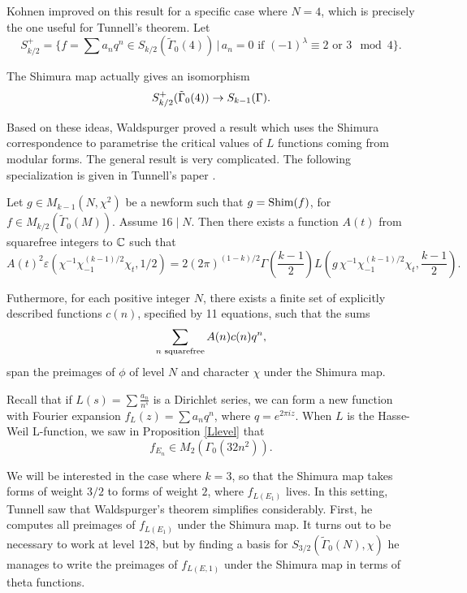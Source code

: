\documentclass[12pt, a4paper]{report}
\begin{document}
Kohnen improved on this result for a specific case where $N = 4$, which is
precisely the one useful for Tunnell's theorem. Let
\[S_{k/2}^+ = \{f = \sum a_n q^n \in S_{k/2}(\tilde{\Gamma}_0(4)) \, | \,
  a_n = 0 \text{ if } (-1)^\lambda \equiv 2 \text{ or } 3 \mod{4}\}.\]

\begin{thm}
  The Shimura map actually gives an isomorphism
  \[S_{k/2}^+(\tilde{\Gamma}_0(4)) \rightarrow S_{k-1}(\Gamma).\]
\end{thm}

Based on these ideas, Waldspurger proved a result which uses the Shimura
correspondence to parametrise the critical values of $L$ functions coming from
modular forms. The general result is very complicated. The following
specialization is given in Tunnell's paper \cite[Page 328]{Tunnell}.

\begin{thm}
  Let $g \in M_{k-1}(N, \chi^2)$ be a newform such that $g = \textnormal{Shim}(f)$, for
  $f \in M_{k/2}(\tilde{\Gamma}_0(M))$. Assume $16 \mid N$. Then there exists a
  function $A(t)$ from squarefree integers to ${\mathbb C}$ such that
  $$A(t)^2 \varepsilon(\chi^{-1} \chi_{-1}^{(k-1)/2} \chi_t, 1/2)
  =2(2\pi)^{(1-k)/2} \Gamma\left(\frac{k-1}{2}\right)
  L\left(g \, \chi^{-1} \chi_{-1}^{(k-1)/2}
      \chi_t, \frac{k-1}{2}\right).$$

  Futhermore, for each positive integer $N$, there exists a finite set of explicitly
  described functions $c(n)$, specified by 11 equations, such that the sums
  \[\sum\limits_{n \textnormal{ squarefree}} A(n)c(n)q^n,\]
  span the preimages of $\phi$ of level $N$ and character $\chi$ under the
  Shimura map.
\end{thm}

Recall that if $L(s) = \sum \frac{a_n}{n^s}$ is a Dirichlet series, we can form
a new function with Fourier expansion $f_L(z) = \sum a_n q^n$, where $q = e^{2
  \pi i z}$. When $L$ is the Hasse-Weil L-function, we saw in Proposition
\autoref{Llevel} that
\[f_{E_n} \in M_2(\Gamma_0(32 n^2)).\]

We will be interested in the case where $k = 3$, so that the Shimura map takes
forms of weight $3/2$ to forms of weight $2$,
where $f_{L(E_1)}$ lives. In this setting, Tunnell
saw that Waldspurger's theorem simplifies considerably.
First, he computes all preimages of $f_{L(E_1)}$
under the Shimura map.
It turns out to be necessary to work at level 128, but by finding a basis
for $S_{3/2}(\tilde{\Gamma}_0(N), \chi)$ he manages to write the preimages of
$f_{L(E,1)}$ under the Shimura map in
terms of theta functions.
\end{document}

